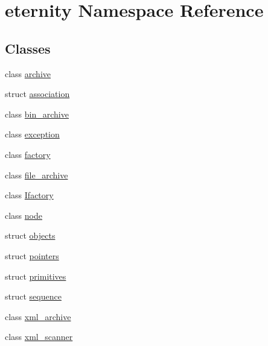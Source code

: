\hypertarget{namespaceeternity}{}\section{eternity Namespace Reference}
\label{namespaceeternity}
\subsection*{Classes}
\begin{DoxyCompactItemize}
\item 
class \hyperlink{classeternity_1_1archive}{archive}
\item 
struct \hyperlink{structeternity_1_1association}{association}
\item 
class \hyperlink{classeternity_1_1bin__archive}{bin\+\_\+archive}
\item 
class \hyperlink{classeternity_1_1exception}{exception}
\item 
class \hyperlink{classeternity_1_1factory}{factory}
\item 
class \hyperlink{classeternity_1_1file__archive}{file\+\_\+archive}
\item 
class \hyperlink{classeternity_1_1_ifactory}{Ifactory}
\item 
class \hyperlink{classeternity_1_1node}{node}
\item 
struct \hyperlink{structeternity_1_1objects}{objects}
\item 
struct \hyperlink{structeternity_1_1pointers}{pointers}
\item 
struct \hyperlink{structeternity_1_1primitives}{primitives}
\item 
struct \hyperlink{structeternity_1_1sequence}{sequence}
\item 
class \hyperlink{classeternity_1_1xml__archive}{xml\+\_\+archive}
\item 
class \hyperlink{classeternity_1_1xml__scanner}{xml\+\_\+scanner}
\end{DoxyCompactItemize}
